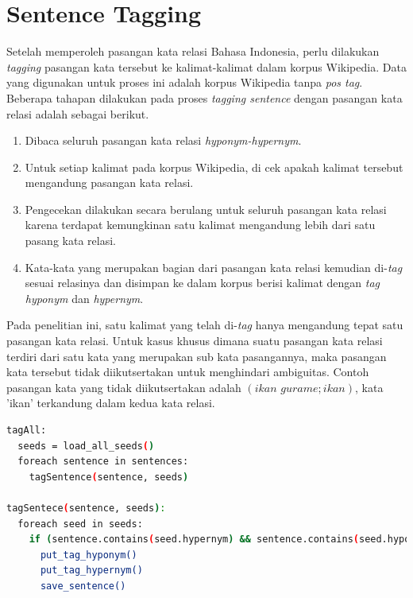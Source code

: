 \section{Sentence Tagging}
Setelah memperoleh pasangan kata relasi Bahasa Indonesia, perlu dilakukan \textit{tagging} pasangan kata tersebut ke kalimat-kalimat dalam korpus Wikipedia. Data yang digunakan untuk proses ini adalah korpus Wikipedia tanpa \textit{pos tag}. Beberapa tahapan dilakukan pada proses \textit{tagging sentence} dengan pasangan kata relasi adalah sebagai berikut.
\begin{enumerate}
  \item Dibaca seluruh pasangan kata relasi \textit{hyponym-hypernym}.
  \item Untuk setiap kalimat pada korpus Wikipedia, di cek apakah kalimat tersebut mengandung pasangan kata relasi.
  \item Pengecekan dilakukan secara berulang untuk seluruh pasangan kata relasi karena terdapat kemungkinan satu kalimat mengandung lebih dari satu pasang kata relasi.
  \item Kata-kata yang merupakan bagian dari pasangan kata relasi kemudian di-\textit{tag} sesuai relasinya dan disimpan ke dalam korpus berisi kalimat dengan \textit{tag} \textit{hyponym} dan \textit{hypernym}.
\end{enumerate}
Pada penelitian ini, satu kalimat yang telah di-\textit{tag} hanya mengandung tepat satu pasangan kata relasi. Untuk kasus khusus dimana suatu pasangan kata relasi terdiri dari satu kata yang merupakan sub kata pasangannya, maka pasangan kata tersebut tidak diikutsertakan untuk menghindari ambiguitas. Contoh pasangan kata yang tidak diikutsertakan adalah $(ikan\,\,gurame;ikan)$, kata 'ikan' terkandung dalam kedua kata relasi.
\begin{lstlisting}[caption={Algoritme \textit{sentence tagging}}, language=bash]
tagAll:
  seeds = load_all_seeds()
  foreach sentence in sentences:
    tagSentence(sentence, seeds)

tagSentece(sentence, seeds):
  foreach seed in seeds:
    if (sentence.contains(seed.hypernym) && sentence.contains(seed.hyponym)):
      put_tag_hyponym()
      put_tag_hypernym()
      save_sentence()
\end{lstlisting}

